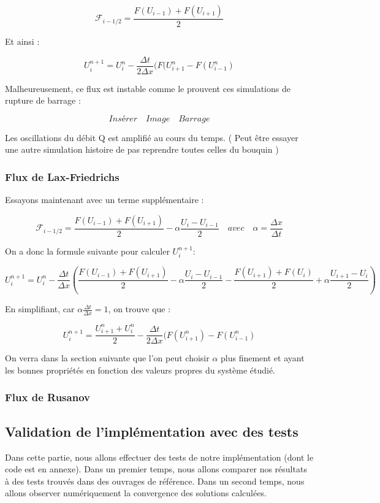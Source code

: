 \documentclass[
11pt, %
francais, %
singlespacing, %
headsepline, %
]{MastersDoctoralThesis} %
\begin{document}
$$ \mathcal{F}_{i-1/2} = \frac{F(U_{i-1}) + F(U_{i+1})}{2} $$

Et ainsi :

$$ U_i ^{n+1} = U_i ^{n}  - \frac{\Delta t}{2 \Delta x} (F(U_{i+1} ^{n} - F(U_{i-1} ^{n} ) $$

Malheureusement, ce flux est instable comme le prouvent ces simulations de rupture de barrage :

$$ Insérer \quad Image \quad Barrage $$

Les oscillations du débit Q est amplifié au cours du temps. ( Peut être essayer une autre simulation histoire de pas reprendre toutes celles du bouquin )

\subsubsection{Flux de Lax-Friedrichs}

Essayons maintenant avec un terme supplémentaire :

$$ \mathcal{F}_{i-1/2} = \frac{F(U_{i-1}) + F(U_{i+1})}{2} - \alpha \frac{U_i - U_{i-1}}{2} \quad avec \quad \alpha = \frac{\Delta x}{\Delta t}$$

On a donc la formule suivante pour calculer $U_i ^{n+1}$:

$$ U_i ^{n+1} = U_i ^{n}  - \frac{\Delta t}{\Delta x} ( \frac{F(U_{i-1}) + F(U_{i+1})}{2} - \alpha \frac{U_i - U_{i-1}}{2} - \frac{F(U_{i+1}) + F(U_i)}{2} + \alpha \frac{U_{i+1} - U_i}{2} ) $$

En simplifiant, car $ \alpha \frac{\Delta t}{\Delta x} = 1 $, on trouve que :

$$ U_i ^{n+1} = \frac{U_{i+1} ^{n} + U_i ^{n}}{2}  - \frac{\Delta t}{2 \Delta x} ( F(U_{i+1} ^n ) - F(U_{i-1} ^n ) $$

On verra dans la section suivante que l'on peut choisir $\alpha$ plus finement et ayant les bonnes propriétés en fonction des valeurs propres du système étudié.

\subsubsection{Flux de Rusanov}



\subsection{Validation de l'implémentation avec des tests}

Dans cette partie, nous allons effectuer des tests de notre implémentation (dont le code est en annexe).
Dans un premier temps, nous allons comparer nos résultats à des tests trouvés dans des ouvrages de référence.
Dans un second temps, nous allons observer numériquement la convergence des solutions calculées.
\end{document}
